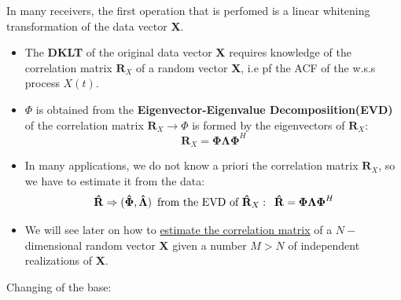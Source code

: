 \noindent In many receivers, the first operation that is perfomed is a linear whitening transformation of the data vector \textbf{X}.
\begin{itemize}
    \item The \textbf{DKLT} of the original data vector \textbf{X} requires knowledge of the correlation matrix \(\textbf{R}_X\) of a random vector \textbf{X}, i.e pf the ACF of the w.s.s process \(X(t)\).
    \item \(\Phi\) is obtained from the \textbf{Eigenvector-Eigenvalue Decomposiition(EVD)} of the correlation matrix \(\textbf{R}_X\rightarrow\Phi\) is formed by the eigenvectors of \(\textbf{R}_X\):
    \[
    \mathbf{R}_X=\mathbf{\Phi\Lambda\Phi}^H
    \]
    \item In many applications, we do not know a priori the correlation matrix \(\mathbf{R}_X\), so we have to estimate it from the data:
    \[
    \mathbf{\hat{R}}\Rightarrow(\mathbf{\hat{\Phi}},\mathbf{\hat{\Lambda}})\hspace{0.5em}\text{from the EVD of }\mathbf{\hat{R}}_X:\hspace{0.5em}\mathbf{\hat{R}}=\mathbf{\Phi\Lambda\Phi}^H    \]
    \item  We will see later on how to \underline{estimate the correlation matrix} of a \(N-\)dimensional random vector \textbf{X} given a number \(M>N\) of independent realizations of \textbf{X}.
\end{itemize}
Changing of the base:

